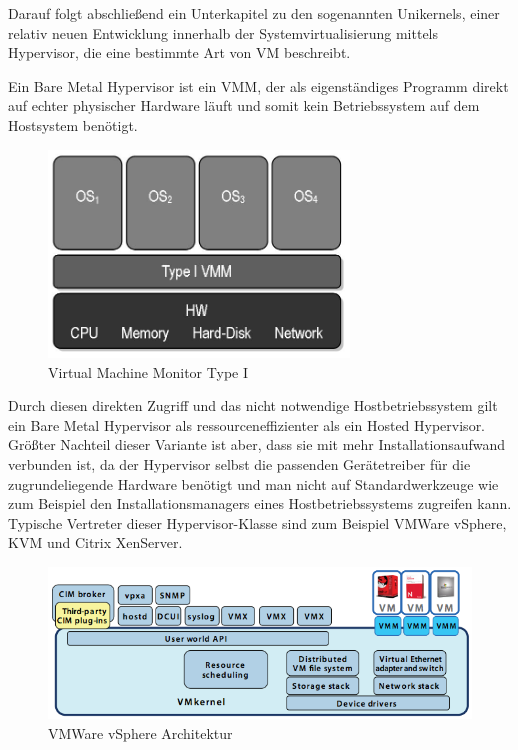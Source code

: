 Darauf folgt abschließend ein Unterkapitel zu den sogenannten Unikernels, einer relativ neuen Entwicklung innerhalb der Systemvirtualisierung mittels Hypervisor, die eine bestimmte Art von \ac{VM} beschreibt.


Ein Bare Metal Hypervisor ist ein \ac{VMM}, der als eigenständiges Programm direkt auf echter physischer Hardware läuft und somit kein Betriebssystem auf dem Hostsystem benötigt.

\begin{figure}[!ht]
  \begin{center}
    \includegraphics[width=8cm]{bilder/VMM-Type1.jpg}
    \caption{Virtual Machine Monitor Type I \citep{wiki:002}}
  \end{center}
\end{figure}

Durch diesen direkten Zugriff und das nicht notwendige Hostbetriebssystem gilt ein Bare Metal Hypervisor als ressourceneffizienter als ein Hosted Hypervisor. Größter Nachteil dieser Variante ist aber, dass sie mit mehr Installationsaufwand verbunden ist, da der Hypervisor selbst die passenden Gerätetreiber für die zugrundeliegende Hardware benötigt und man nicht auf Standardwerkzeuge wie zum Beispiel den Installationsmanagers eines Hostbetriebssystems zugreifen kann. Typische Vertreter dieser Hypervisor-Klasse sind zum Beispiel VMWare vSphere, KVM und Citrix XenServer.

\begin{figure}[!ht]
  \begin{center}
    \includegraphics[width=14cm]{bilder/vmware.png}
    \caption{VMWare vSphere Architektur \citep{vmware:002}}
  \end{center}
\end{figure}

